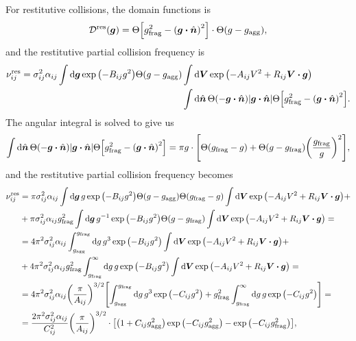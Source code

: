 \documentclass[aps,prl,preprint,groupedaddress,10pt]{revtex4-2}
\begin{document}
For restitutive collisions, the domain functions is
\begin{equation}
    \utx{\mathcal{D}}{res}(\bg)=\Theta\bqty{\ltx{g}{frag}^2-\pqty{\bg\vdot\bn}^2}
    \cdot\Theta\pqty{g-\ltx{g}{agg}},
\end{equation}
and the restitutive partial collision frequency is
\begin{equation}
    \begin{split}
        \utx{\nu_{ij}}{res}=\sigma_{ij}^2\alpha_{ij}\int\dd{\bg}\exp\pqty{-B_{ij}g^2}
        \Theta\pqty{g-\ltx{g}{agg}}
        &\int\dd{\bV}\exp\pqty{-A_{ij}V^2+R_{ij}\bV\vdot\bg}\\
        &\int\dd{\bn}\Theta\pqty{-\bg\vdot\bn}\abs{\bg\vdot\bn}
        \Theta\bqty{\ltx{g}{frag}^2-\pqty{\bg\vdot\bn}^2}.
    \end{split}
\end{equation}
The angular integral is solved to give us
\begin{equation}
    \int\dd{\bn}\Theta\pqty{-\bg\vdot\bn}\abs{\bg\vdot\bn}
    \Theta\bqty{\ltx{g}{frag}^2-\pqty{\bg\vdot\bn}^2}=\pi g\cdot
    \bqty{\Theta\pqty{\ltx{g}{frag}-g}+\Theta\pqty{g-\ltx{g}{frag}}
        \pqty{\frac{\ltx{g}{frag}}{g}}^2},
\end{equation}
and the restitutive partial collision frequency becomes
\begin{equation}
    \begin{split}
        \utx{\nu_{ij}}{res}&=\pi\sigma_{ij}^2\alpha_{ij}\int\dd{\bg}g\exp\pqty{-B_{ij}g^2}
        \Theta\pqty{g-\ltx{g}{agg}}\Theta\pqty{\ltx{g}{frag}-g}
        \int\dd{\bV}\exp\pqty{-A_{ij}V^2+R_{ij}\bV\vdot\bg}+\\
        &+\pi\sigma_{ij}^2\alpha_{ij}\ltx{g}{frag}^2\int\dd{\bg}g^{-1}\exp\pqty{-B_{ij}g^2}
        \Theta\pqty{g-\ltx{g}{frag}}\int\dd{\bV}\exp\pqty{-A_{ij}V^2+R_{ij}\bV\vdot\bg}=\\
        &=4\pi^2\sigma_{ij}^2\alpha_{ij}\int_{\ltx{g}{agg}}^{\ltx{g}{frag}}
        \dd{g}g^3\exp\pqty{-B_{ij}g^2}
        \int\dd{\bV}\exp\pqty{-A_{ij}V^2+R_{ij}\bV\vdot\bg}+\\
        &+4\pi^2\sigma_{ij}^2\alpha_{ij}\ltx{g}{frag}^2\int_{\ltx{g}{frag}}^{\infty}
        \dd{g}g\exp\pqty{-B_{ij}g^2}\int\dd{\bV}\exp\pqty{-A_{ij}V^2+R_{ij}\bV\vdot\bg}=\\
        &=4\pi^2\sigma_{ij}^2\alpha_{ij}\pqty{\frac{\pi}{A_{ij}}}^{3/2}
        \bqty{\int_{\ltx{g}{agg}}^{\ltx{g}{frag}}\dd{g}g^3\exp\pqty{-C_{ij}g^2}+
        \ltx{g}{frag}^2\int_{\ltx{g}{frag}}^{\infty}\dd{g}g\exp\pqty{-C_{ij}g^2}}=\\
        &=\frac{2\pi^2\sigma_{ij}^2\alpha_{ij}}{C_{ij}^2}\pqty{\frac{\pi}{A_{ij}}}^{3/2}
        \cdot\bqty{\pqty{1+C_{ij}\ltx{g}{agg}^2}\exp\pqty{-C_{ij}\ltx{g}{agg}^2}-
        \exp\pqty{-C_{ij}\ltx{g}{frag}^2}},
    \end{split}
\end{equation}
\end{document}
